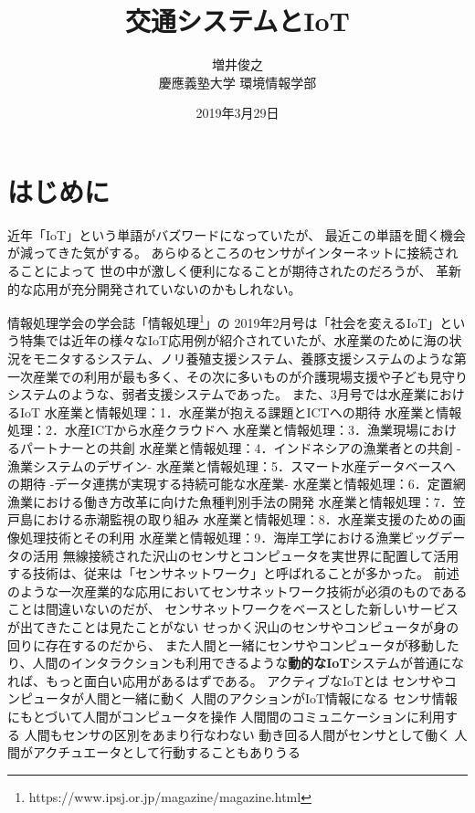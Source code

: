 \documentclass[twocolumn,10pt]{jarticle}
\title{交通システムとIoT}
\author{増井俊之 \\ 慶應義塾大学 環境情報学部}
\date{2019年3月29日}
\begin{document}
\maketitle

\thispagestyle{empty}


\section{はじめに}
  
近年「IoT」という単語がバズワードになっていたが、
最近この単語を聞く機会が減ってきた気がする。
あらゆるところのセンサがインターネットに接続されることによって
世の中が激しく便利になることが期待されたのだろうが、
革新的な応用が充分開発されていないのかもしれない。

情報処理学会の学会誌「情報処理\footnote{
  \textsf{https://www.ipsj.or.jp/magazine/magazine.html}
}」の
2019年2月号は「社会を変えるIoT」という特集では近年の様々なIoT応用例が紹介されていたが、水産業のために海の状況をモニタするシステム、ノリ養殖支援システム、養豚支援システムのような第一次産業での利用が最も多く、その次に多いものが介護現場支援や子ども見守りシステムのような、弱者支援システムであった。
また、3月号では水産業におけるIoT
水産業と情報処理：1．水産業が抱える課題とICTへの期待
水産業と情報処理：2．水産ICTから水産クラウドへ
水産業と情報処理：3．漁業現場におけるパートナーとの共創
水産業と情報処理：4．インドネシアの漁業者との共創 -漁業システムのデザイン-
水産業と情報処理：5．スマート水産データベースへの期待 -データ連携が実現する持続可能な水産業-
水産業と情報処理：6．定置網漁業における働き方改革に向けた魚種判別手法の開発
水産業と情報処理：7．笠戸島における赤潮監視の取り組み
水産業と情報処理：8．水産業支援のための画像処理技術とその利用
水産業と情報処理：9．海岸工学における漁業ビッグデータの活用
無線接続された沢山のセンサとコンピュータを実世界に配置して活用する技術は、従来は「センサネットワーク」と呼ばれることが多かった。
前述のような一次産業的な応用においてセンサネットワーク技術が必須のものであることは間違いないのだが、
センサネットワークをベースとした新しいサービスが出てきたことは見たことがない
せっかく沢山のセンサやコンピュータが身の回りに存在するのだから、
また人間と一緒にセンサやコンピュータが移動したり、人間のインタラクションも利用できるような\textbf{動的なIoT}システムが普通になれば、もっと面白い応用があるはずである。
アクティブなIoTとは
センサやコンピュータが人間と一緒に動く
人間のアクションがIoT情報になる
センサ情報にもとづいて人間がコンピュータを操作
人間間のコミュニケーションに利用する
人間もセンサの区別をあまり行なわない
動き回る人間がセンサとして働く
人間がアクチュエータとして行動することもありうる
\end{document}
